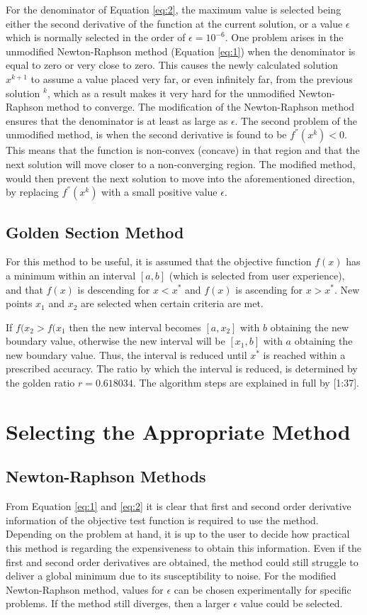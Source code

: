 \documentclass[a4paper,10pt]{article}
\begin{document}
For the denominator of Equation \ref{eq:2}, the maximum value is selected being either the second derivative of the function at the current solution, or a value $\epsilon$ which is normally selected in the order of $\epsilon = 10^{-6}$. One problem arises in the unmodified Newton-Raphson method (Equation \ref{eq:1}) when the denominator is equal to zero or very close to zero. This causes the newly calculated solution $x^{k+1}$ to assume a value placed very far, or even infinitely far, from the previous solution $^{k}$, which as a result makes it very hard for the unmodified Newton-Raphson method to converge. The modification of the Newton-Raphson method ensures that the denominator is at least as large as $\epsilon$. The second problem of the unmodified method, is when the second derivative is found to be $f^{''}(x^{k}) < 0$. This means that the function is non-convex (concave) in that region and that the next solution will move closer to a non-converging region. The modified method, would then prevent the next solution to move into the aforementioned direction, by replacing $f^{''}(x^{k})$ with a small positive value $\epsilon$.

\subsection{Golden Section Method}
For this method to be useful, it is assumed that the objective function $f(x)$ has a minimum within an interval $[a,b]$ (which is selected from user experience), and that $f(x)$ is descending for $x < x^*$ and $f(x)$ is ascending for $x > x^*$. New points $x_{1}$ and $x_{2}$ are selected when certain criteria are met.

If $f(x_{2} > f(x_{1}$ then the new interval becomes $[a,x_{2}]$ with $b$ obtaining the new boundary value, otherwise the new interval will be $[x_{1},b]$ with $a$ obtaining the new boundary value. Thus, the interval is reduced until $x^{*}$ is reached within a prescribed accuracy. The ratio by which the interval is reduced, is determined by the golden ratio $r=0.618034$. The algorithm steps are explained in full by [1:37].

\section{Selecting the Appropriate Method}
\subsection{Newton-Raphson Methods}
From Equation \ref{eq:1} and \ref{eq:2} it is clear that first and second order derivative information of the objective test function is required to use the method. Depending on the problem at hand, it is up to the user to decide how practical this method is regarding the expensiveness to obtain this information. Even if the first and second order derivatives are obtained, the method could still struggle to deliver a global minimum due to its susceptibility to noise. For the modified Newton-Raphson method, values for $\epsilon$ can be chosen experimentally for specific problems. If the method still diverges, then a larger $\epsilon$ value could be selected.
\end{document}
